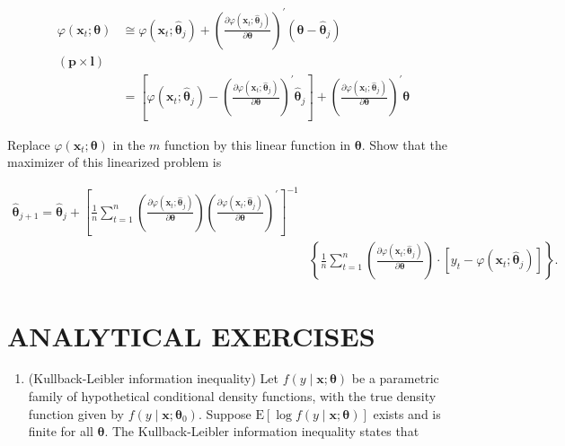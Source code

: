 \documentclass[10pt]{article}
\begin{document}
\begin{align*}
\varphi\left(\mathbf{x}_{t} ; \boldsymbol{\theta}\right) & \cong \varphi\left(\mathbf{x}_{t} ; \hat{\boldsymbol{\theta}}_{j}\right)+\left(\frac{\partial \varphi\left(\mathbf{x}_{t} ; \hat{\boldsymbol{\theta}}_{j}\right)}{\partial \boldsymbol{\theta}}\right)^{\prime}\left(\boldsymbol{\theta}-\hat{\boldsymbol{\theta}}_{j}\right) \\
(\boldsymbol{p} \times \mathbf{l}) &  \tag{7.5.11}\\
& =\left[\varphi\left(\mathbf{x}_{t} ; \hat{\boldsymbol{\theta}}_{j}\right)-\left(\frac{\partial \varphi\left(\mathbf{x}_{t} ; \hat{\boldsymbol{\theta}}_{j}\right)}{\partial \boldsymbol{\theta}}\right)^{\prime} \hat{\boldsymbol{\theta}}_{j}\right]+\left(\frac{\partial \varphi\left(\mathbf{x}_{t} ; \hat{\boldsymbol{\theta}}_{j}\right)}{\partial \boldsymbol{\theta}}\right)^{\prime} \boldsymbol{\theta}
\end{align*}


Replace $\varphi\left(\mathbf{x}_{t} ; \boldsymbol{\theta}\right)$ in the $m$ function by this linear function in $\boldsymbol{\theta}$. Show that the maximizer of this linearized problem is


\begin{align*}
\hat{\boldsymbol{\theta}}_{j+1}=\hat{\boldsymbol{\theta}}_{j}+\left[\frac{1}{n} \sum_{t=1}^{n}\left(\frac{\partial \varphi\left(\mathbf{x}_{t} ; \hat{\boldsymbol{\theta}}_{j}\right)}{\partial \boldsymbol{\theta}}\right)\left(\frac{\partial \varphi\left(\mathbf{x}_{t} ; \hat{\boldsymbol{\theta}}_{j}\right)}{\partial \boldsymbol{\theta}}\right)^{\prime}\right]^{-1} & \\
& \left\{\frac{1}{n} \sum_{t=1}^{n}\left(\frac{\partial \varphi\left(\mathbf{x}_{t} ; \hat{\boldsymbol{\theta}}_{j}\right)}{\partial \boldsymbol{\theta}}\right) \cdot\left[y_{t}-\varphi\left(\mathbf{x}_{t} ; \hat{\boldsymbol{\theta}}_{j}\right)\right]\right\} . \tag{7.5.12}
\end{align*}


\section*{ANALYTICAL EXERCISES}
\begin{enumerate}
  \item (Kullback-Leibler information inequality) Let $f(y \mid \mathbf{x} ; \boldsymbol{\theta})$ be a parametric family of hypothetical conditional density functions, with the true density function given by $f\left(y \mid \mathbf{x} ; \boldsymbol{\theta}_{0}\right)$. Suppose $\mathrm{E}[\log f(y \mid \mathbf{x} ; \boldsymbol{\theta})]$ exists and is finite for all $\boldsymbol{\theta}$. The Kullback-Leibler information inequality states that
\end{enumerate}
\end{document}
